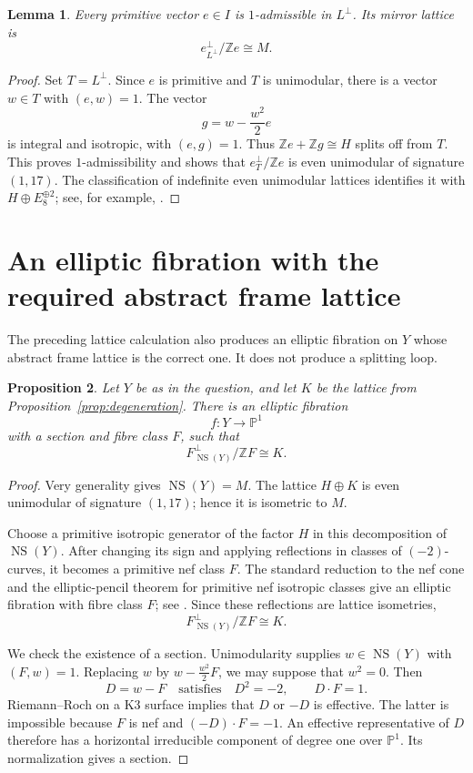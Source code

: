 \documentclass[11pt]{article}
\newcommand{\Z}{\mathbb Z}
\newcommand{\NS}{\operatorname{NS}}
\newtheorem{lemma}{Lemma}[section]
\newtheorem{proposition}[lemma]{Proposition}
\theoremstyle{remark}
\begin{document}
\begin{lemma}\label{lem:mirror}
Every primitive vector \(e\in I\) is \(1\)-admissible in \(L^\perp\).
Its mirror lattice is
\[
 e^\perp_{L^\perp}/\Z e\cong M.
\]
\end{lemma}

\begin{proof}
Set \(T=L^\perp\).
Since \(e\) is primitive and \(T\) is unimodular, there is a vector
\(w\in T\) with \((e,w)=1\).
The vector
\[
 g=w-\frac{w^2}{2}e
\]
is integral and isotropic, with \((e,g)=1\).
Thus \(\Z e+\Z g\cong H\) splits off from \(T\).
This proves \(1\)-admissibility and shows that
\(e^\perp_T/\Z e\) is even unimodular of signature \((1,17)\).
The classification of indefinite even unimodular lattices identifies
it with \(H\oplus E_8^{\oplus2}\); see, for example,
\cite[Section~1.14]{Nik80}.
\end{proof}

\section{An elliptic fibration with the required abstract frame lattice}

The preceding lattice calculation also produces an elliptic fibration
on \(Y\) whose abstract frame lattice is the correct one.
It does not produce a splitting loop.

\begin{proposition}\label{prop:fibration}
Let \(Y\) be as in the question, and let \(K\) be the lattice from
Proposition~\ref{prop:degeneration}.
There is an elliptic fibration
\[
 f:Y\longrightarrow\mathbb P^1
\]
with a section and fibre class \(F\), such that
\[
 F^\perp_{\NS(Y)}/\Z F\cong K.
\]
\end{proposition}

\begin{proof}
Very generality gives \(\NS(Y)=M\).
The lattice \(H\oplus K\) is even unimodular of signature \((1,17)\);
hence it is isometric to \(M\).

Choose a primitive isotropic generator of the factor \(H\) in this
decomposition of \(\NS(Y)\).
After changing its sign and applying reflections in classes of
\((-2)\)-curves, it becomes a primitive nef class \(F\).
The standard reduction to the nef cone and the elliptic-pencil
theorem for primitive nef isotropic classes give an elliptic
fibration with fibre class \(F\); see
\cite[Chapter~8, Section~2, and Chapter~11, Section~1]{Huy16}.
Since these reflections are lattice isometries,
\[
 F^\perp_{\NS(Y)}/\Z F\cong K.
\]

We check the existence of a section.
Unimodularity supplies \(w\in\NS(Y)\) with \((F,w)=1\).
Replacing \(w\) by \(w-\frac{w^2}{2}F\), we may suppose that \(w^2=0\).
Then
\[
 D=w-F
 \quad\text{satisfies}\quad
 D^2=-2,\qquad D\cdot F=1.
\]
Riemann--Roch on a K3 surface implies that \(D\) or \(-D\) is effective.
The latter is impossible because \(F\) is nef and
\((-D)\cdot F=-1\).
An effective representative of \(D\) therefore has a horizontal
irreducible component of degree one over \(\mathbb P^1\).
Its normalization gives a section.
\end{proof}
\end{document}
